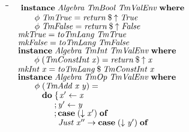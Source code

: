 \documentclass[10pt]{article}
\newlength{\lwidth}\setlength{\lwidth}{4.5cm}
\newlength{\cwidth}\setlength{\cwidth}{8mm} %
\newcommand{\Conid}[1]{\mathit{#1}}
\newcommand{\Varid}[1]{\mathit{#1}}
\begin{document}
\begin{tabbing}
\qquad\=\hspace{\lwidth}\=\hspace{\cwidth}\=\+\kill
${\hskip1.00em\relax\mathbf{instance}\;\Conid{Algebra}\;\Conid{TmBool}\;\Conid{TmValEnv}\;\mathbf{where}}$\\
${\hskip1.00em\relax\hskip2.00em\relax\Varid{\phi}\;\Conid{TmTrue}\mathrel{=}\Varid{return}\mathbin{\$}\Varid{\uparrow}\;\Conid{True}}$\\
${\hskip1.00em\relax\hskip2.00em\relax\Varid{\phi}\;\Conid{TmFalse}\mathrel{=}\Varid{return}\mathbin{\$}\Varid{\uparrow}\;\Conid{False}}$\\
${}$\\
${\hskip1.00em\relax\Varid{mkTrue}\mathrel{=}\Varid{toTmLang}\;\Conid{TmTrue}}$\\
${\hskip1.00em\relax\Varid{mkFalse}\mathrel{=}\Varid{toTmLang}\;\Conid{TmFalse}}$\\
${}$\\
${\hskip1.00em\relax\mathbf{instance}\;\Conid{Algebra}\;\Conid{TmInt}\;\Conid{TmValEnv}\;\mathbf{where}}$\\
${\hskip1.00em\relax\hskip2.00em\relax\Varid{\phi}\;(\Conid{TmConstInt}\;\Varid{x})\mathrel{=}\Varid{return}\mathbin{\$}\Varid{\uparrow}\;\Varid{x}}$\\
${}$\\
${\hskip1.00em\relax\Varid{mkInt}\;\Varid{x}\mathrel{=}\Varid{toTmLang}\mathbin{\$}\Conid{TmConstInt}\;\Varid{x}}$\\
${}$\\
${\hskip1.00em\relax\mathbf{instance}\;\Conid{Algebra}\;\Conid{TmOp}\;\Conid{TmValEnv}\;\mathbf{where}}$\\
${\hskip1.00em\relax\hskip2.00em\relax\Varid{\phi}\;(\Conid{TmAdd}\;\Varid{x}\;\Varid{y})\mathrel{=}}$\\
${\hskip1.00em\relax\hskip2.00em\relax\phantom{\Varid{\phi}\;\mbox{}}\mathbf{do}\;\{\mskip1.5mu \Varid{x'}\leftarrow \Varid{x}}$\\
${\hskip1.00em\relax\hskip2.00em\relax\phantom{\Varid{\phi}\;\mbox{}}\phantom{\mathbf{do}\;\mbox{}};\Varid{y'}\leftarrow \Varid{y}}$\\
${\hskip1.00em\relax\hskip2.00em\relax\phantom{\Varid{\phi}\;\mbox{}}\phantom{\mathbf{do}\;\mbox{}};\mathbf{case}\;(\Varid{\downarrow}\;\Varid{x'})\;\mathbf{of}}$\\
${\hskip1.00em\relax\hskip2.00em\relax\phantom{\Varid{\phi}\;\mbox{}}\phantom{\mathbf{do}\;\mbox{}}\phantom{;\mbox{}}\Conid{Just}\;\Varid{x''}\to \mathbf{case}\;(\Varid{\downarrow}\;\Varid{y'})\;\mathbf{of}}$\\

\end{tabbing}
\end{document}
